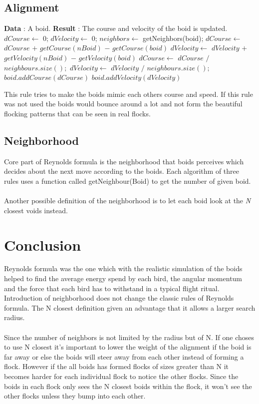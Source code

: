 \documentclass[a4paper]{article}
\begin{document}
\subsection{Alignment}
\begin{algorithm}
\begin{algorithmic}
\State \textbf{Data} : A boid.
\State \textbf{Result} : The course and velocity of the boid is updated.
 \State $dCourse \gets$ 0;
 \State $dVelocity \gets$ 0;
 \State $neighbors \gets$ getNeighbors(boid);
         \State $dCourse \gets$ $dCourse$ $+$ $getCourse(nBoid)$ $-$ $getCourse(boid)$
          \State $dVelocity \gets$ $dVelocity$ $+$ $getVelocity(nBoid)$ $-$ $getVelocity(boid)$
        \EndFor 
           \State $dCourse \gets$ $dCourse$ $/$ $neighbours.size();$
            \State $dVelocity \gets$ $dVelocity$ $/$ $neighbours.size();$
              \State $boid.addCourse(dCourse)$
              \State $boid.addVelocity(dVelocity)$
\end{algorithmic}
\end{algorithm}
This rule tries to make the boids mimic each others course and speed. If this rule was not used the boids would bounce around a lot and not form the beautiful flocking patterns that can be seen in real flocks.

\subsection{Neighborhood}
Core part of Reynolds formula is the neighborhood that boids perceives which decides about the next move according to the boids. Each algorithm of three rules uses a function called getNeighbour(Boid) to get the number of given boid.\\
\\
Another possible definition of the neighborhood is to let each boid look at the \textit{N} closest voids instead.
\section{Conclusion}
Reynolds formula was the one which with the realistic simulation of the boids helped to find  the average energy spend by each bird, the angular momentum and the force that each bird has to withstand in a typical flight ritual. Introduction of neighborhood does not change the classic rules of Reynolds formula. The N closest definition given an advantage that it allows a larger search radius.\\
\\
Since the number of neighbors is not limited by the radius but of N. If one choses
to use N closest it’s important to lower the weight of the alignment if the boid is
far away or else the boids will steer away from each other instead of forming a flock.
However if the all boids has formed flocks of sizes greater than N it becomes harder
for each individual flock to notice the other flocks. Since the boids in each flock
only sees the N closest boids within the flock, it won’t see the other flocks unless
they bump into each other.\\
\\
\end{document}
